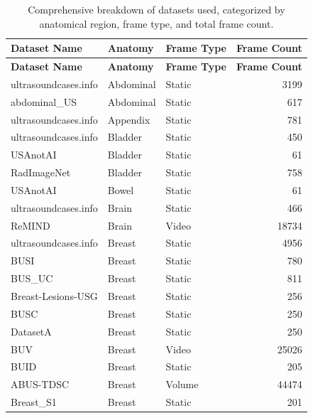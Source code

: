 \documentclass{article}
\theoremstyle{plain}
\theoremstyle{definition}
\theoremstyle{remark}
\begin{document}
\begin{small}
\begin{center}
\begin{sc}
\begin{longtable}{lllr}
\caption{Comprehensive breakdown of datasets used, categorized by anatomical region, frame type, and total frame count.} \label{tab:dataset_breakdown} \\
\toprule
\textbf{Dataset Name} & \textbf{Anatomy} & \textbf{Frame Type} & \textbf{Frame Count} \\ \midrule
\endfirsthead
\toprule
\textbf{Dataset Name} & \textbf{Anatomy} & \textbf{Frame Type} & \textbf{Frame Count} \\ \midrule
\endhead
\bottomrule
\endfoot
ultrasoundcases.info & Abdominal & Static & 3199 \\
abdominal\_US \cite{vitale_improving_2020} & Abdominal & Static & 617 \\
ultrasoundcases.info & Appendix & Static & 781 \\
ultrasoundcases.info & Bladder & Static & 450 \\
USAnotAI \cite{kim-ann_ftsvdusanotai_2024} & Bladder & Static & 61 \\
RadImageNet \cite{mei_radimagenet_2022} & Bladder & Static & 758 \\
USAnotAI & Bowel & Static & 61 \\
ultrasoundcases.info & Brain & Static & 466 \\
ReMIND \cite{juvekar_brain_2023} & Brain & Video & 18734 \\
ultrasoundcases.info & Breast & Static & 4956 \\
BUSI \cite{al-dhabyani_dataset_2019} & Breast & Static & 780 \\
BUS\_UC \cite{iqbal_bus_uc_2023} & Breast & Static & 811 \\
Breast-Lesions-USG \cite{pawlowska_curated_2024} & Breast & Static & 256 \\
BUSC \cite{iqbal_busc_2023} & Breast & Static & 250 \\
DatasetA \cite{jimenez_ultrasound_2024} & Breast & Static & 250 \\
BUV \cite{lin_new_2022} & Breast & Video & 25026 \\
BUID \cite{abbasian_ardakani_open-access_2023} & Breast & Static & 205 \\
ABUS-TDSC \cite{luo_tumor_2025} & Breast & Volume & 44474 \\
Breast\_S1 \cite{guo_segmentation_2021} & Breast & Static & 201 \\

\end{longtable}
\end{sc}
\end{center}
\end{small}
\end{document}
